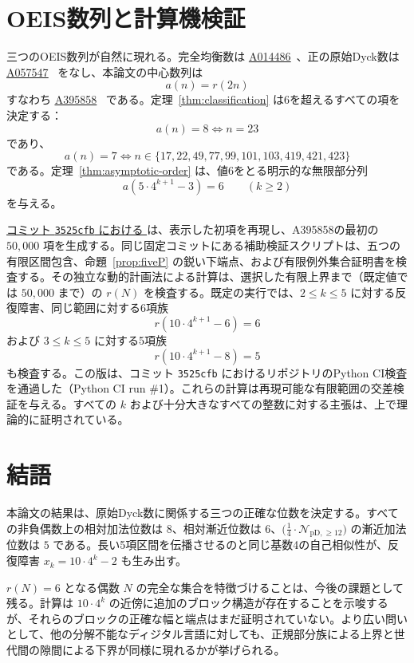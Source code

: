 \documentclass[12pt]{ltjsarticle}
\theoremstyle{plain}
\theoremstyle{definition}
\theoremstyle{plain}
\newcommand{\Pset}{%
  \bigl(\tfrac{1}{4}\cdot\mathcal{N}_{\mathrm{pD},\geq 12}\bigr)%
}
\newcommand{\seqnum}[1]{\href{https://oeis.org/#1}{\textrm{\underline{#1}}}}
\begin{document}
\section{OEIS数列と計算機検証}
\label{sec:oeis}

三つのOEIS数列が自然に現れる。完全均衡数は \seqnum{A014486}~\cite{OEIS-A014486}、正の原始Dyck数は \seqnum{A057547}~\cite{OEIS-A057547} をなし、本論文の中心数列は
\[
  a(n)=r(2n)
\]
すなわち \seqnum{A395858}~\cite{OEIS-A395858} である。定理~\ref{thm:classification} は6を超えるすべての項を決定する：
\[
  a(n)=8\iff n=23
\]
であり、
\[
  a(n)=7\iff
  n\in\{17,22,49,77,99,101,103,419,421,423\}
\]
である。定理~\ref{thm:asymptotic-order} は、値6をとる明示的な無限部分列
\begin{equation}\label{eq:A395858-six-subsequence}
  a(5\cdot4^{k+1}-3)=6\qquad(k\geq2)
\end{equation}
を与える。

\href{https://github.com/growupkuriyama-hub/lean_cfg_project/blob/3525cfb/LeanCfgProject/PrimDyck/A395858.py}{コミット \texttt{3525cfb} における }
は、表示した初項を再現し、A395858の最初の $50{,}000$ 項を生成する。同じ固定コミットにある補助検証スクリプトは、五つの有限区間包含、命題~\ref{prop:fiveP} の鋭い下端点、および有限例外集合証明書を検査する。その独立な動的計画法による計算は、選択した有限上界まで（既定値では $50{,}000$ まで）の $r(N)$ を検査する。既定の実行では、$2\leq k\leq5$ に対する反復障害、同じ範囲に対する6項族
\[
 r(10\cdot4^{k+1}-6)=6
\]
および $3\leq k\leq5$ に対する5項族
\[
 r(10\cdot4^{k+1}-8)=5
\]
も検査する。この版は、コミット \texttt{3525cfb} におけるリポジトリのPython CI検査を通過した（Python CI run \#1）。これらの計算は再現可能な有限範囲の交差検証を与える。すべての $k$ および十分大きなすべての整数に対する主張は、上で理論的に証明されている。

\section{結語}

本論文の結果は、原始Dyck数に関係する三つの正確な位数を決定する。すべての非負偶数上の相対加法位数は $8$、相対漸近位数は $6$、$\Pset$ の漸近加法位数は $5$ である。長い5項区間を伝播させるのと同じ基数4の自己相似性が、反復障害 $x_k=10\cdot4^k-2$ も生み出す。

$r(N)=6$ となる偶数 $N$ の完全な集合を特徴づけることは、今後の課題として残る。計算は $10\cdot4^k$ の近傍に追加のブロック構造が存在することを示唆するが、それらのブロックの正確な幅と端点はまだ証明されていない。より広い問いとして、他の分解不能なディジタル言語に対しても、正規部分族による上界と世代間の隙間による下界が同様に現れるかが挙げられる。
\end{document}
